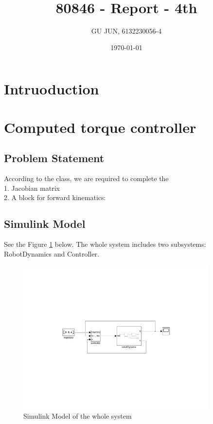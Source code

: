 \documentclass{article}
\title{80846 - Report - 4th}
\author{GU JUN, 6132230056-4}
\date{\today}
\begin{document}
\maketitle

\section*{Intruoduction}


\section{\centering \Large Computed torque controller}

\subsection*{Problem Statement}

According to the class, we are required to complete the \\
1. Jacobian matrix \\
2. A block for forward kinematics: \\


\subsection{Simulink Model}
See the Figure \ref{fig:model_task_model} below. The whole system includes two subsystems: RobotDynamics and Controller.
\begin{figure}[ht]
    \centering
    \includegraphics[width=0.9\textwidth]{figures/model_task_space.pdf}
    \caption{Simulink Model of the whole system}
    \label{fig:model_task_model}
\end{figure}
\end{document}
